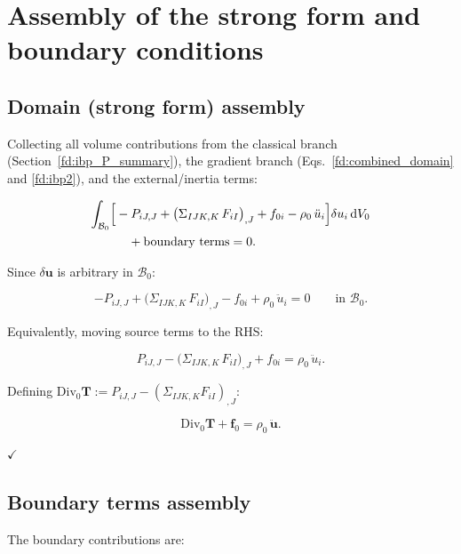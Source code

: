 \documentclass[11pt]{article}
\newcommand{\bu}{\mathbf{u}}
\newcommand{\bu}{\mathbf{u}}
\begin{document}
\section{Assembly of the strong form and boundary conditions}

\subsection{Domain (strong form) assembly}

Collecting all volume contributions from the classical branch
(Section~\ref{fd:ibp_P_summary}), the gradient branch
(Eqs.~\eqref{fd:combined_domain} and \eqref{fd:ibp2}), and the
external/inertia terms:

\begin{align}
\int_{\mathcal{B}_{0}}\Bigl[
&-P_{iJ,J}
+ \bigl(\Sigma_{IJK,K}\,F_{iI}\bigr)_{,J}
+ f_{0i}
- \rho_{0}\,\ddot{u}_{i}
\Bigr]\delta u_{i}\,\mathrm{d}V_{0}
\nonumber\\
&\quad + \text{boundary terms} = 0.
\end{align}

Since $\delta\bu$ is arbitrary in $\mathcal{B}_{0}$:

\begin{equation}
\boxed{
-P_{iJ,J} + \bigl(\Sigma_{IJK,K}\,F_{iI}\bigr)_{,J}
- f_{0i} + \rho_{0}\,\ddot{u}_{i} = 0
\qquad\text{in }\mathcal{B}_{0}.
}
\end{equation}

Equivalently, moving source terms to the RHS:

\begin{equation}
P_{iJ,J} - \bigl(\Sigma_{IJK,K}\,F_{iI}\bigr)_{,J} + f_{0i}
= \rho_{0}\,\ddot{u}_{i}.
\end{equation}

Defining $\mathrm{Div}_{0}\mathbf{T}
:= P_{iJ,J}-(\Sigma_{IJK,K}F_{iI})_{,J}$:

\begin{equation}
\mathrm{Div}_{0}\mathbf{T} + \mathbf{f}_{0}
= \rho_{0}\,\ddot{\mathbf{u}}.
\end{equation}

$\checkmark$

\subsection{Boundary terms assembly}

The boundary contributions are:
\end{document}
